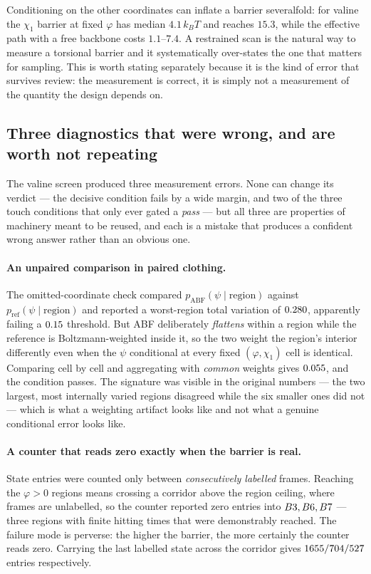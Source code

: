 \begin{remark}
\label{rem:clamped}
Conditioning on the other coordinates can inflate a barrier severalfold: for valine the
$\chi_1$ barrier at fixed $\varphi$ has median $4.1\,k_BT$ and reaches $15.3$, while the
effective path with a free backbone costs $1.1$--$7.4$. A restrained scan is the natural way
to measure a torsional barrier and it systematically over-states the one that matters for
sampling. This is worth stating separately because it is the kind of error that survives
review: the measurement is correct, it is simply not a measurement of the quantity the design
depends on.
\end{remark}

\subsection{Three diagnostics that were wrong, and are worth not repeating}
\label{sec:neutrality_diagnostics}
The valine screen produced three measurement errors. None can change its verdict --- the
decisive condition fails by a wide margin, and two of the three touch conditions that only
ever gated a \emph{pass} --- but all three are properties of machinery meant to be reused,
and each is a mistake that produces a confident wrong answer rather than an obvious one.

\paragraph{An unpaired comparison in paired clothing.} The omitted-coordinate check compared
$p_{\mathrm{ABF}}(\psi\mid \text{region})$ against $p_{\mathrm{ref}}(\psi\mid \text{region})$
and reported a worst-region total variation of $0.280$, apparently failing a
$0.15$ threshold. But ABF deliberately \emph{flattens} within a region while the
reference is Boltzmann-weighted inside it, so the two weight the region's interior
differently even when the $\psi$ conditional at every fixed $(\varphi,\chi_1)$ cell is
identical. Comparing cell by cell and aggregating with \emph{common} weights gives
$0.055$, and the condition passes. The signature was visible in the original numbers
--- the two largest, most internally varied regions disagreed while the six smaller ones did
not --- which is what a weighting artifact looks like and not what a genuine conditional
error looks like.

\paragraph{A counter that reads zero exactly when the barrier is real.} State entries were
counted only between \emph{consecutively labelled} frames. Reaching the $\varphi>0$ regions
means crossing a corridor above the region ceiling, where frames are unlabelled, so the
counter reported zero entries into $B3, B6, B7$ --- three regions with finite hitting
times that were demonstrably reached. The failure mode is perverse: the higher the barrier,
the more certainly the counter reads zero. Carrying the last labelled state across the
corridor gives $1655/704/527$ entries respectively.

